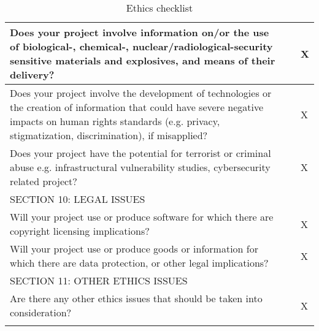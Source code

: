 \begin{longtable}{|p{12cm}|p{1cm}|p{1cm}|}
Does your project involve information on/or the use of biological-, chemical-, nuclear/radiological-security sensitive materials and explosives, and means of their delivery? &     & X  \\ \hline
Does your project involve the development of technologies or the creation of information that could have severe negative impacts on human rights standards (e.g. privacy, stigmatization, discrimination), if misapplied?   &     & X  \\ \hline
Does your project have the potential for terrorist or criminal abuse e.g. infrastructural vulnerability studies, cybersecurity related project?  &     & X  \\ \hline

\rowcolor[HTML]{FFFE65} 
SECTION 10: LEGAL ISSUES &     &    \\ \hline
Will your project use or produce software for which there are copyright licensing implications?   &     & X  \\ \hline
Will your project use or produce goods or information for which there are data protection, or other legal implications?   &    &  X  \\ \hline

\rowcolor[HTML]{FFFE65} 
SECTION 11: OTHER ETHICS ISSUES  &     &    \\ \hline
Are there any other ethics issues that should be taken into consideration?  &    & X  \\ \hline

\caption{Ethics checklist \label{tab:ethics_checklist}} \\

\end{longtable}
